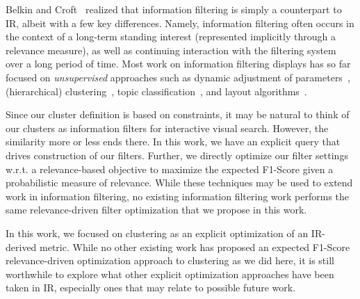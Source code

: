Belkin and Croft~\cite{Belkin1992} realized that information filtering is simply a counterpart to IR, albeit with a few key differences.  Namely,  
information filtering often occurs in the context of a long-term standing interest (represented implicitly through a relevance measure), as well as continuing interaction with the filtering system over a long period of time.
Most work on information filtering  displays has so far focused on \emph{unsupervised} approaches such as 
dynamic adjustment of parameters~\cite{Ahlberg1995,Bennamane2012,Young1993},
(hierarchical) clustering~\cite{Nocaj2012,Teitler2008,Smith2009}, 
topic classification~\cite{Sankaranarayanan2009,Liu2012,Liu2009}, 
and layout algorithms~\cite{Yifan2015,Jacomy2014,Sugiyama1981,Kamada1989}.

Since our cluster definition is based on constraints, it may be natural to think of our clusters as information filters for interactive visual search.  However, the similarity more or less ends there.  In this work, we have an explicit query that drives construction of our filters.  Further, we directly optimize our filter settings w.r.t. a relevance-based objective to maximize the expected F1-Score given a probabilistic measure of relevance.  While these techniques may be used to extend work in information filtering, no existing information filtering work performs the same relevance-driven filter optimization that we propose in this work.




In this work, we focused on clustering as an explicit optimization of an IR-derived metric.  While no other existing work has proposed an expected F1-Score relevance-driven optimization approach to clustering as we did here, it is still worthwhile to explore what other explicit optimization approaches have been taken in IR, especially ones that may relate to possible future work.  

